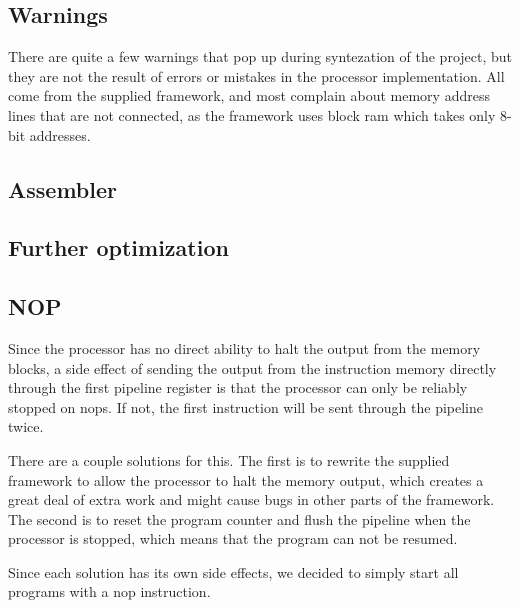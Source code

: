 \subsection{Warnings}

There are quite a few warnings that pop up during syntezation of the project, but they are not the result of errors or mistakes in the processor implementation.
All come from the supplied framework, and most complain about memory address lines that are not connected, as the framework uses block ram which takes only 8-bit addresses.

\subsection{Assembler}

\subsection{Further optimization}

\subsection{NOP}

Since the processor has no direct ability to halt the output from the memory blocks, a side effect of sending the output from the instruction memory directly through the first pipeline register is that the processor can only be reliably stopped on nops.
If not, the first instruction will be sent through the pipeline twice.

There are a couple solutions for this.
The first is to rewrite the supplied framework to allow the processor to halt the memory output, which creates a great deal of extra work and might cause bugs in other parts of the framework.
The second is to reset the program counter and flush the pipeline when the processor is stopped, which means that the program can not be resumed.

Since each solution has its own side effects, we decided to simply start all programs with a nop instruction.

